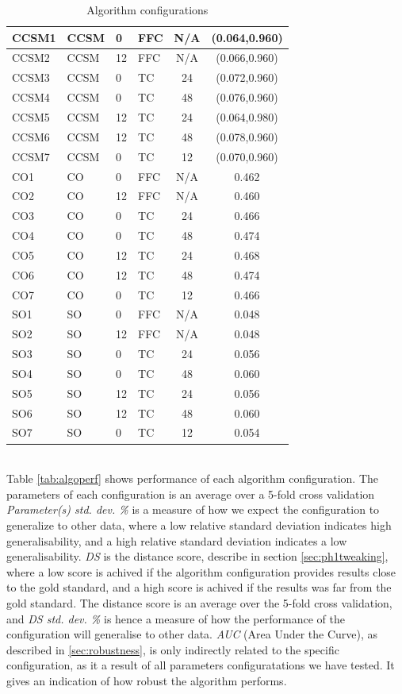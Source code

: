 \begin{table}[!ht]
\begin{tabular}{| l | l | p{2cm} | p{2cm} | c | c | }
    CCSM1 & CCSM & 0 & FFC & N/A & (0.064,0.960) \\\hline
    CCSM2 & CCSM & 12 & FFC & N/A & (0.066,0.960) \\\hline
    CCSM3 & CCSM & 0 & TC & 24 & (0.072,0.960) \\\hline
    CCSM4 & CCSM & 0 & TC & 48 & (0.076,0.960) \\\hline
    CCSM5 & CCSM & 12 & TC & 24 & (0.064,0.980) \\\hline
    CCSM6 & CCSM & 12 & TC & 48 & (0.078,0.960) \\\hline
    CCSM7 & CCSM & 0 & TC & 12 & (0.070,0.960) \\\hline\hline
%
    CO1 & CO & 0 & FFC & N/A & 0.462 \\\hline
    CO2 & CO & 12 & FFC & N/A & 0.460 \\\hline
    CO3 & CO & 0 & TC & 24 & 0.466 \\\hline
    CO4 & CO & 0 & TC & 48 & 0.474 \\\hline
    CO5 & CO & 12 & TC & 24 & 0.468 \\\hline
    CO6 & CO & 12 & TC & 48 & 0.474 \\\hline
    CO7 & CO & 0 & TC & 12 & 0.466 \\\hline\hline
%
    SO1 & SO & 0 & FFC & N/A & 0.048 \\\hline
    SO2 & SO & 12 & FFC & N/A & 0.048 \\\hline
    SO3 & SO & 0 & TC & 24 & 0.056 \\\hline
    SO4 & SO & 0 & TC & 48 & 0.060 \\\hline
    SO5 & SO & 12 & TC & 24 & 0.056 \\\hline
    SO6 & SO & 12 & TC & 48 & 0.060 \\\hline
    SO7 & SO & 0 & TC & 12 & 0.054 \\\hline%
%
  \end{tabular}
\caption{Algorithm configurations}
\label{tab:algoconfigs}
\end{table}\\
%
Table \ref{tab:algoperf} shows performance of each algorithm configuration. The parameters of each configuration is an average over a 5-fold cross validation \textit{Parameter(s) std. dev. \%} is a measure of how we expect the configuration to generalize to other data, where a low relative standard deviation indicates high generalisability, and a high relative standard deviation indicates a low generalisability. \textit{DS} is the distance score, describe in section \ref{sec:ph1tweaking}, where a low score is achived if the algorithm configuration provides results close to the gold standard, and a high score is achived if the results was far from the gold standard. The distance score is an average over the 5-fold cross validation, and \textit{DS std. dev. \%} is hence a measure of how the performance of the configuration will generalise to other data. \textit{AUC} (Area Under the Curve), as described in \ref{sec:robustness}, is only indirectly related to the specific configuration, as it a result of all parameters configuratations we have tested. It gives an indication of how robust the algorithm performs.
